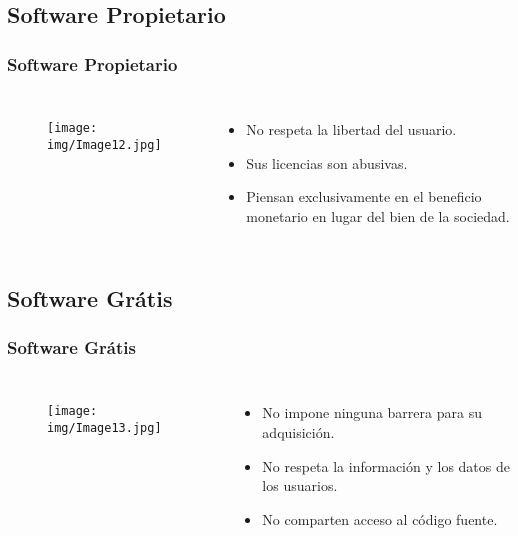 \documentclass{beamer}
\begin{document}
\AtBeginSubsection[]
{
  \begin{frame}
    \tableofcontents[sectionstyle=show/shaded,subsectionstyle=show/shaded/hide,subsectionstyle=show/shaded/hide]
  \end{frame}
}

\subsection{Software Propietario}


\begin{frame}
  \frametitle{Software Propietario}
  \centering
  \begin{columns}
    \begin{figure}[H]
      \centering
      \texttt{[image: img/Image12.jpg]}
    \end{figure}

    \begin{itemize}
      \item No respeta la libertad del usuario.
      \item Sus licencias son abusivas.
      \item Piensan exclusivamente en el beneficio monetario en lugar del bien de la sociedad.
    \end{itemize}
  \end{columns}
\end{frame}


\AtBeginSubsection[]
{
  \begin{frame}
    \tableofcontents[sectionstyle=show/shaded,subsectionstyle=show/shaded/hide,subsectionstyle=show/shaded/hide]
  \end{frame}
}

\subsection{Software Grátis}

\begin{frame}
  \frametitle{Software Grátis}
  \centering
  \begin{columns}
    \begin{figure}[H]
      \centering
      \texttt{[image: img/Image13.jpg]}
    \end{figure}

    \begin{itemize}
      \item No impone ninguna barrera para su adquisición.
      \item No respeta la información y los datos de los usuarios.
      \item No comparten acceso al código fuente.
    \end{itemize}
  \end{columns}
\end{frame}
\end{document}
